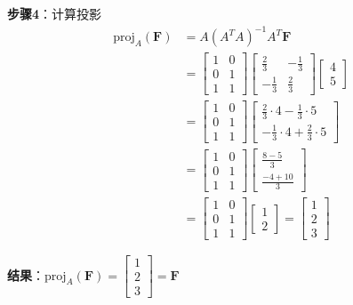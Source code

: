 \documentclass[12pt,a4paper]{article}
\begin{document}
\textbf{步骤4}：计算投影
\begin{align}
\text{proj}_{A}(\bm{F}) &= A (A^T A)^{-1} A^T \bm{F} \\
&= \begin{bmatrix} 1 & 0 \\ 0 & 1 \\ 1 & 1 \end{bmatrix} \begin{bmatrix} \frac{2}{3} & -\frac{1}{3} \\ -\frac{1}{3} & \frac{2}{3} \end{bmatrix} \begin{bmatrix} 4 \\ 5 \end{bmatrix} \\
&= \begin{bmatrix} 1 & 0 \\ 0 & 1 \\ 1 & 1 \end{bmatrix} \begin{bmatrix} \frac{2}{3} \cdot 4 - \frac{1}{3} \cdot 5 \\ -\frac{1}{3} \cdot 4 + \frac{2}{3} \cdot 5 \end{bmatrix} \\
&= \begin{bmatrix} 1 & 0 \\ 0 & 1 \\ 1 & 1 \end{bmatrix} \begin{bmatrix} \frac{8-5}{3} \\ \frac{-4+10}{3} \end{bmatrix} \\
&= \begin{bmatrix} 1 & 0 \\ 0 & 1 \\ 1 & 1 \end{bmatrix} \begin{bmatrix} 1 \\ 2 \end{bmatrix} = \begin{bmatrix} 1 \\ 2 \\ 3 \end{bmatrix}
\end{align}

\textbf{结果}：$\text{proj}_{A}(\bm{F}) = \begin{bmatrix} 1 \\ 2 \\ 3 \end{bmatrix} = \bm{F}$
\end{document}
